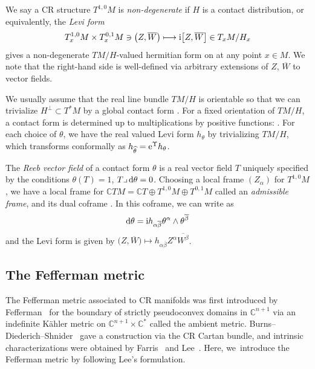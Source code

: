 \documentclass[pdftex]{sigma}
\renewcommand\a{\alpha}
\renewcommand\b{\beta}
\renewcommand\th{\theta}
\newcommand\ol{\overline}
\newcommand{\wh}{\widehat}
\numberwithin{equation}{section}
\begin{document}
We say a CR structure $T^{1, 0}M$ is {\it non-degenerate} if $H$ is a contact distribution, or equivalently, the {\it Levi form}
\[
T^{1, 0}_xM\times T^{0, 1}_xM\ni\bigl(Z, \ol W\bigr)\longmapsto {\rm i}\bigl[Z, \ol W\bigr]
\in T_xM/H_x
\]
gives a non-degenerate $TM/H$-valued hermitian form on  at any point $x\in M$. We note that the right-hand side is well-defined via arbitrary extensions of $Z$, $\ol W$ to vector fields.

We usually assume that the real line bundle $TM/H$ is orientable so that we can trivialize $H^\perp \subset T^*M$ by a global contact form \smash{$\th\in \Gamma\bigl(H^\perp\bigr)$}. For a fixed orientation of $TM/H$, a contact form is determined up to multiplications by positive functions:
\smash{$\th\mapsto \wh\th={\rm e}^{\Upsilon}\th$, $\Upsilon\in C^\infty(M)$}. For each choice of $\th$, we have the real valued Levi form $h_\th$ by trivializing $TM/H$, which transforms conformally as $h_{\wh\th}={\rm e}^\Upsilon h_\th$.

The {\it Reeb vector field} of a contact form $\th$ is a real vector field $T$ uniquely
specified by the conditions $\th(T)=1$, $T\lrcorner\, {\rm d}\th=0$. Choosing a local frame $(Z_\a)$ for $T^{1, 0}M$, we have a local frame \smash{$\bigl(T, Z_\a, Z_{\ol\a}:=\ol{Z_\a}\bigr)$} for $\mathbb{C}TM=\mathbb{C}T\oplus T^{1, 0}M\oplus T^{0,1}M$ called an {\it admissible frame}, and its dual coframe \smash{$\bigl(\th, \th^\a, \th^{\ol\a}=\ol{\th^\a}\bigr)$}. In this coframe, we can write as
\[
{\rm d}\th={\rm i} h_{\a\ol\b}\th^\a\wedge\th^{\ol\b}
\]
and the Levi form is given by $\bigl(Z, \ol W\bigr)\mapsto h_{\a\ol\b}Z^\a \ol{W^\b}$.

\subsection{The Fefferman metric}\label{CR-Fefferman-metric}
The Fefferman metric associated to CR manifolds was first introduced by Fefferman~\cite{F} for the boundary of strictly pseudoconvex domains in $\mathbb{C}^{n+1}$ via an indefinite K\"ahler metric on $\mathbb{C}^{n+1}\times\mathbb{C}^*$ called the ambient metric. Burns--Diederich--Shnider~\cite{BDS} gave a construction via the CR Cartan bundle, and intrinsic characterizations were obtained by Farris~\cite{Fa} and Lee~\cite{Lee}.
Here, we~introduce the Fefferman metric by following Lee's formulation.
\end{document}
